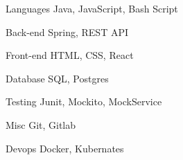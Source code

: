 

\begin{cvskills}

  \cvskill
    {Languages} %
    {Java, JavaScript, Bash Script} %

  \cvskill
    {Back-end} %
    {Spring, REST API} %

  \cvskill
    {Front-end} %
    {HTML, CSS, React} %

  \cvskill
    {Database} %
    {SQL, Postgres} %

  \cvskill
    {Testing} %
    {Junit, Mockito, MockService} %

  \cvskill
    {Misc} %
    {Git, Gitlab} %

  \cvskill
    {Devops} %
    {Docker, Kubernates} %

\end{cvskills}
